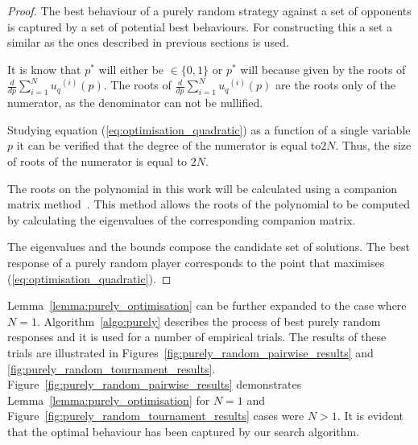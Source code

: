 \documentclass[10pt]{article}
\begin{document}
\begin{proof}
    The best behaviour of a purely random strategy against a set of opponents is
    captured by a set of potential best behaviours. For constructing this a set
    a similar as the ones described in previous sections is used.

    It is know that \(p ^ *\) will either be \(\in \{0, 1\}\) or \(p ^ *\) will because
    given by the roots of \(\frac{d}{dp} \sum\limits_{i=1} ^ {N} {u_q}^{(i)}(p)\).
    The roots of  \(\frac{d}{dp} \sum\limits_{i=1} ^ {N} {u_q}^{(i)} (p)\) are the roots 
    only of the numerator, as the denominator can not be nullified.

    Studying equation (\ref{eq:optimisation_quadratic}) as a function of a single variable
    \(p\) it can be verified that the degree of the numerator is equal to\(2N\).
    Thus, the size of roots of the numerator is equal to \(2N\).

    The roots on the polynomial in this work will be calculated using a companion
    matrix method~\cite{Edelman1995}. This method allows the roots of the polynomial to
    be computed by calculating the eigenvalues of the corresponding companion
    matrix.

    The eigenvalues and the bounds compose the candidate set of solutions. The
    best response of a purely random player corresponds to the point that maximises
    (\ref{eq:optimisation_quadratic}).
\end{proof}

Lemma~\ref{lemma:purely_optimisation} can be further expanded to the case where \(N=1\).
Algorithm~\ref{algo:purely} describes the process of best purely random responses and it is
used for a number of empirical trials.
The results of these trials are illustrated in Figures~\ref{fig:purely_random_pairwise_results}
and \ref{fig:purely_random_tournament_results}. Figure~\ref{fig:purely_random_pairwise_results}
demonstrates Lemma~\ref{lemma:purely_optimisation} for \(N=1\) and
Figure~\ref{fig:purely_random_tournament_results} cases were \(N>1\).
It is evident that the optimal behaviour has been captured by our search algorithm.
\end{document}
